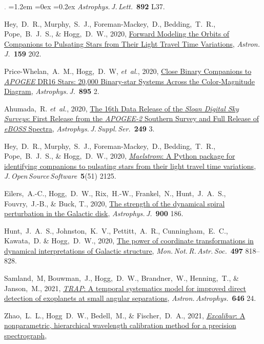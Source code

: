 \documentclass[10pt,letterpaper]{article}
\newcommand{\acronym}[1]{{\small{#1}}}
\newcommand{\foreign}[1]{\textsl{#1}}
\newcommand{\etal}{\foreign{et~al.}}
\newcommand{\project}[1]{\textsl{#1}}
\newcommand{\doi}[2]{\href{http://dx.doi.org/#1}{{#2}}}
\newcommand{\deemph}[1]{\textcolor{grey}{\footnotesize{#1}}}
\newcommand{\pubnumber}[1]{\deemph{{#1}.}}
\newcounter{refpubnum}
\newcommand{\hogglist}{%
    \rightmargin=0in
    \leftmargin=1.2em
    \topsep=0ex
    \partopsep=0pt
    \itemsep=0.2ex
    \parsep=0pt
    \itemindent=-1.0\leftmargin
    \listparindent=0.0\leftmargin
    \settowidth{\labelsep}{~}
    \usecounter{refpubnum}
  }
\begin{document}
\begin{list}{\pubnumber{\therefpubnum}}{\hogglist}
  \textit{Astrophys.\,J.\,Lett.}\ \textbf{892} L37.
\item
  Hey,~D.~R., Murphy,~S.~J., Foreman-Mackey,~D., Bedding,~T.~R.,
  Pope,~B.~J.~S., \& Hogg,~D.~W., 2020,
  \doi{10.3847/1538-3881/ab7d38}{Forward Modeling the Orbits of Companions to Pulsating Stars from Their Light Travel Time Variations},
  \textit{Astron.\,J.}\ \textbf{159} 202.
\item
  Price-Whelan,~A.~M., Hogg,~D.~W, \etal, 2020,
  \doi{10.3847/1538-4357/ab8acc}{Close Binary Companions to \project{\acronym{APOGEE}} \acronym{DR16} Stars: 20,000 Binary-star Systems Across the Color-Magnitude Diagram},
  \textit{Astrophys.\,J.}\ \textbf{895} 2.
\item
  Ahumada,~R. \etal, 2020,
  \doi{10.3847/1538-4365/ab929e}{The 16th Data Release of the \project{Sloan Digital Sky Surveys}: First Release from the \project{\acronym{APOGEE-2}} Southern Survey and Full Release of \project{e\acronym{BOSS}} Spectra},
  \textit{Astrophys.\,J.\,Suppl.\,Ser.}\ \textbf{249} 3.
\item
  Hey,~D.~R., Murphy,~S.~J., Foreman-Mackey,~D., Bedding,~T.~R.,
  Pope,~B.~J.~S., \& Hogg,~D.~W., 2020,
  \doi{10.21105/joss.02125}{\project{Maelstrom}: A Python package for identifying companions to pulsating stars from their light travel time variations},
  \textit{J.\,Open\,Source\,Software}\ \textbf{5}(51) 2125.
\item
  Eilers,~A.-C., Hogg,~D.~W., Rix,~H.-W., Frankel,~N., Hunt,~J.~A.~S., Fouvry,~J.-B.,
  \& Buck, T., 2020,
  \doi{10.3847/1538-4357/abac0b}{The strength of the dynamical spiral perturbation in the Galactic disk},
  \textit{Astrophys.\,J.}\ \textbf{900} 186.
\item
  Hunt,~J.~A.~S., Johnston,~K.~V., Pettitt,~A.~R., Cunningham,~E.~C., Kawata,~D. \& Hogg,~D.~W., 2020,
  \doi{10.1093/mnras/staa1987}{The power of coordinate transformations in dynamical interpretations of Galactic structure},
  \textit{Mon.\,Not.\,R.\,Astr.\,Soc.}\ \textbf{497} 818--828.
\item
  Samland,~M, Bouwman,~J., Hogg,~D.~W., Brandner,~W., Henning,~T., \& Janson,~M., 2021,
  \doi{10.1051/0004-6361/201937308}{\project{\acronym{TRAP}}: A temporal systematics model for improved direct detection of exoplanets at small angular separations},
  \textit{Astron.\,Astrophys.}\ \textbf{646} 24.
\item
  Zhao,~L.~L., Hogg~D.~W., Bedell,~M., \& Fischer,~D.~A., 2021,
  \doi{10.3847/1538-3881/abd105}{\project{Excalibur}: A nonparametric, hierarchical wavelength calibration method for a precision spectrograph},

\end{list}
\end{document}

